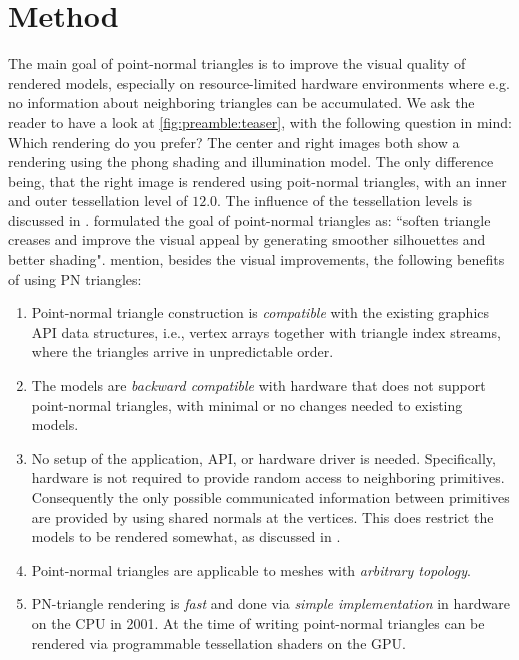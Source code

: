 
\section{Method}
\label{s:method}
The main goal of point-normal triangles is to improve the visual quality of rendered models, especially on resource-limited hardware environments where e.g. no information about neighboring triangles can be accumulated. We ask the reader to have a look at \cref{fig:preamble:teaser}, with the following question in mind: Which rendering do you prefer? The center and right images both show a rendering using the phong shading and illumination model. The only difference being, that the right image is rendered using poit-normal triangles, with an inner and outer tessellation level of $12.0$. The influence of the tessellation levels is discussed in . \citeauthor{vlachos2001curved} formulated the goal of point-normal triangles as: ``soften triangle creases and improve the visual appeal by generating smoother silhouettes and better shading". \citeauthor{vlachos2001curved} mention, besides the visual improvements, the following benefits of using PN triangles:

\begin{enumerate}[label=(\roman*)]
 	\item 
 		Point-normal triangle construction is \textit{compatible} with the existing graphics API data structures, i.e., vertex arrays together with triangle index streams, where the triangles arrive in unpredictable order.
 	\item 
 		The models are \textit{backward compatible} with hardware that does not support point-normal triangles, with minimal or no changes needed to existing models.
 	\item 
 		No setup of the application, API, or hardware driver is needed. Specifically, hardware is not required to provide random access to neighboring primitives. Consequently the only possible communicated information between primitives are provided by using shared normals at the vertices. This does restrict the models to be rendered somewhat, as discussed in .
 	\item 
 		Point-normal triangles are applicable to meshes with \textit{arbitrary topology}.
 	\item 
 		PN-triangle rendering is \textit{fast} and done via \textit{simple implementation} in hardware on the CPU in 2001. At the time of writing point-normal triangles can be rendered via programmable tessellation shaders on the GPU.
 \end{enumerate} 

